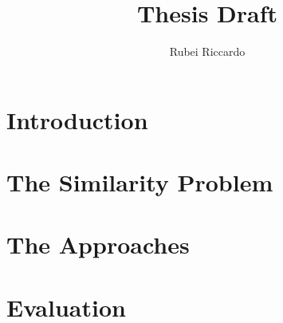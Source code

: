 \documentclass[11pt]{article} %
\title{Thesis Draft}
\author{Rubei Riccardo}
\begin{document}
\maketitle
\newpage
\tableofcontents
\newpage
















		\section{Introduction}
		\label{sec:Introduction}
		
		\clearpage

		\section{The Similarity Problem}
		\label{sec:Similarity}
		
		\clearpage

		\section{The Approaches}
		\label{sec:Approaches}
		
		\clearpage

		\section{Evaluation}
		\label{src:Evaluation}
		

		
		
\end{document}
